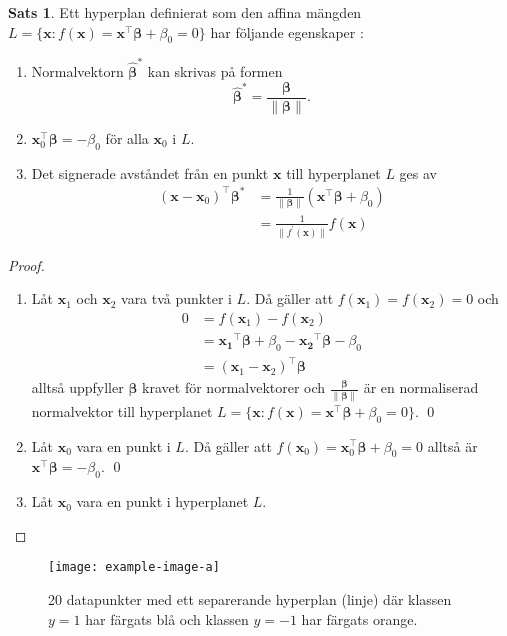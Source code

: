 \documentclass[a4paper, 12pt]{report}
\theoremstyle{definition}
\newtheorem{thm}{Sats}[section]
\newcommand{\bfbeta}{\boldsymbol{\beta}}
\begin{document}
\begin{thm}
	Ett hyperplan definierat som den affina mängden $L=\{ \mathbf{x} : f(\mathbf{x})=\mathbf{x}^\intercal \bfbeta + \beta_0=0\}$ har följande egenskaper \cite{ESL}:
	\begin{enumerate}
		\item Normalvektorn $\hat{\bfbeta}^*$ kan skrivas på formen
		\begin{equation*}
			\hat{\bfbeta}^* = \frac{\bfbeta}{\|\bfbeta\|}.
		\end{equation*}
		\item $\mathbf{x}_0^\intercal \bfbeta = -\beta_0$ för alla $\mathbf{x}_0$ i $L$.
		\item Det signerade avståndet från en punkt $\mathbf{x}$ till hyperplanet $L$ ges av
		\begin{equation*}
		\begin{aligned}
			(\mathbf{x}-\mathbf{x}_0)^\intercal \bfbeta^* &= \frac{1}{\|\bfbeta\|}(\mathbf{x}^\intercal \bfbeta+\beta_0)\\
			&= \frac{1}{\|f^\prime(\mathbf{x})\|}f(\mathbf{x}) 
		\end{aligned}
		\end{equation*}
	\end{enumerate}
\end{thm}
\begin{proof}
	\leavevmode
\begin{enumerate}
	\item Låt $\mathbf{x}_1$ och $\mathbf{x}_2$ vara två punkter i $L$. Då gäller att $f(\mathbf{x}_1)=f(\mathbf{x}_2)=0$ och
	\begin{align*}
		0 &= f(\mathbf{x}_1)-f(\mathbf{x}_2)\\
		&= \mathbf{x_1}^\intercal \bfbeta + \beta_0 - \mathbf{x_2}^ \intercal \bfbeta - \beta_0\\
		&= (\mathbf{x}_1-\mathbf{x}_2)^\intercal \bfbeta
	\end{align*}
	alltså uppfyller $\bfbeta$ kravet för normalvektorer och $\frac{\bfbeta}{\|\bfbeta\|}$ är en normaliserad normalvektor till hyperplanet $L=\{ \mathbf{x} : f(\mathbf{x})=\mathbf{x}^\intercal \bfbeta + \beta_0=0\}$. \hfill\qed
	\item Låt $\mathbf{x}_0$ vara en punkt i $L$. Då gäller att $f(\mathbf{x}_0)=\mathbf{x}_0^\intercal \bfbeta + \beta_0 = 0$ alltså är $\mathbf{x}^\intercal \bfbeta = - \beta_0$. \hfill \qed
	\item Låt $\mathbf{x}_0$ vara en punkt i hyperplanet $L$.\qedhere
\end{enumerate}
\end{proof}
\begin{figure}
\centering
\texttt{[image: example-image-a]}
\caption{\label{fig:separatinghyperplane}20 datapunkter med ett separerande hyperplan (linje) där klassen $y=1$ har färgats blå och klassen $y=-1$ har färgats orange.}
\end{figure}



\end{document}

